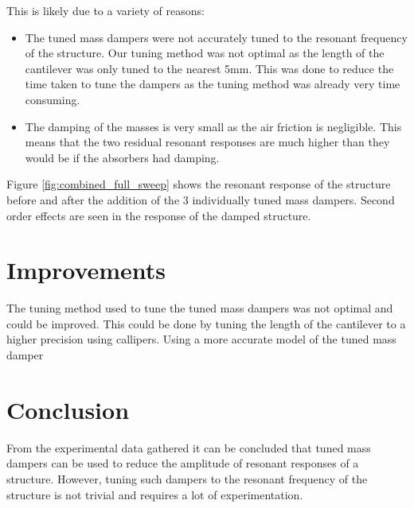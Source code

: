 \documentclass[8pt]{article}
\begin{document}
This is likely due to a variety of reasons:
\begin{itemize}
    \item The tuned mass dampers were not accurately tuned to the resonant frequency of the structure. Our tuning method was not optimal as the length of the cantilever was only tuned to the nearest 5mm.
            This was done to reduce the time taken to tune the dampers as the tuning method was already very time consuming.
    \item The damping of the masses is very small as the air friction is negligible. This means that the two residual resonant responses are much higher than they would be if the absorbers had damping.
\end{itemize}

Figure \ref{fig:combined_full_sweep} shows the resonant response of the structure before and after the addition of the 3 individually tuned mass dampers.
Second order effects are seen in the response of the damped structure.

\section{Improvements}

The tuning method used to tune the tuned mass dampers was not optimal and could be improved.
This could be done by tuning the length of the cantilever to a higher precision using callipers.
Using a more accurate model of the tuned mass damper

\section{Conclusion}

From the experimental data gathered it can be concluded that tuned mass dampers can be used to reduce the amplitude of resonant responses of a structure.
However, tuning such dampers to the resonant frequency of the structure is not trivial and requires a lot of experimentation.
\end{document}
